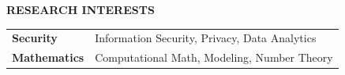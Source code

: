 \documentclass[a4paper, 12pt]{article}
\begin{document}
\begin{flushleft}
\faLightbulb\quad\textbf{RESEARCH INTERESTS}

\begin{table}[h!]
\centering
\begin{tabular}{ll}
  \textbf{Security} & Information Security, Privacy, Data Analytics \\
  \textbf{Mathematics} & Computational Math, Modeling, Number Theory
\end{tabular}
\end{table}

\end{flushleft}

\end{document}

